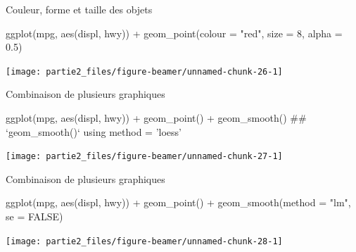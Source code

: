 \documentclass[12pt,ignorenonframetext,]{beamer}
\newenvironment{Shaded}{}{}
\newcommand{\KeywordTok}[1]{\textcolor[rgb]{0.00,0.00,1.00}{#1}}
\newcommand{\DataTypeTok}[1]{#1}
\newcommand{\DecValTok}[1]{#1}
\newcommand{\FloatTok}[1]{#1}
\newcommand{\StringTok}[1]{\textcolor[rgb]{0.00,0.50,0.50}{#1}}
\newcommand{\OtherTok}[1]{\textcolor[rgb]{1.00,0.25,0.00}{#1}}
\newcommand{\OperatorTok}[1]{#1}
\newcommand{\NormalTok}[1]{#1}
\renewenvironment{Shaded}{\begin{snugshade}}{\end{snugshade}}
\begin{document}
\begin{frame}[fragile]{Couleur, forme et taille des objets}

\footnotesize \center

\begin{Shaded}
\begin{Highlighting}[]
\KeywordTok{ggplot}\NormalTok{(mpg, }\KeywordTok{aes}\NormalTok{(displ, hwy)) }\OperatorTok{+}
\StringTok{  }\KeywordTok{geom_point}\NormalTok{(}\DataTypeTok{colour =} \StringTok{"red"}\NormalTok{, }\DataTypeTok{size =} \DecValTok{8}\NormalTok{, }\DataTypeTok{alpha =} \FloatTok{0.5}\NormalTok{)}
\end{Highlighting}
\end{Shaded}

\texttt{[image: partie2\_files/figure-beamer/unnamed-chunk-26-1]}

\end{frame}

\begin{frame}[fragile]{Combinaison de plusieurs graphiques}

\footnotesize \center

\begin{Shaded}
\begin{Highlighting}[]
\KeywordTok{ggplot}\NormalTok{(mpg, }\KeywordTok{aes}\NormalTok{(displ, hwy)) }\OperatorTok{+}
\StringTok{  }\KeywordTok{geom_point}\NormalTok{() }\OperatorTok{+}\StringTok{ }\KeywordTok{geom_smooth}\NormalTok{()}
\NormalTok{  ## `geom_smooth()` using method = 'loess'}
\end{Highlighting}
\end{Shaded}

\texttt{[image: partie2\_files/figure-beamer/unnamed-chunk-27-1]}

\end{frame}

\begin{frame}[fragile]{Combinaison de plusieurs graphiques}

\footnotesize \center

\begin{Shaded}
\begin{Highlighting}[]
\KeywordTok{ggplot}\NormalTok{(mpg, }\KeywordTok{aes}\NormalTok{(displ, hwy)) }\OperatorTok{+}
\StringTok{  }\KeywordTok{geom_point}\NormalTok{() }\OperatorTok{+}\StringTok{ }\KeywordTok{geom_smooth}\NormalTok{(}\DataTypeTok{method =} \StringTok{"lm"}\NormalTok{, }\DataTypeTok{se =} \OtherTok{FALSE}\NormalTok{)}
\end{Highlighting}
\end{Shaded}

\texttt{[image: partie2\_files/figure-beamer/unnamed-chunk-28-1]}

\end{frame}
\end{document}
